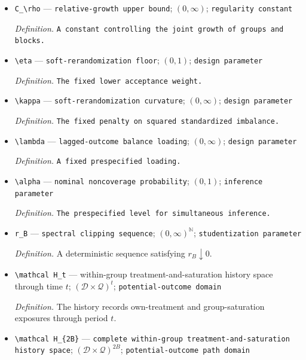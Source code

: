 \documentclass{article}
\begin{document}
\begin{itemize}
  \item \texttt{C\_\allowbreak{}\textbackslash{}\allowbreak{}rho} --- \texttt{relative-\allowbreak{}growth upper bound}; \((0,\infty)\); \texttt{regularity constant}
  \par\smallskip\noindent\emph{Definition.} \texttt{A constant controlling the joint growth of groups and blocks.}
  \item \texttt{\textbackslash{}\allowbreak{}eta} --- \texttt{soft-\allowbreak{}rerandomization floor}; \((0,1)\); \texttt{design parameter}
  \par\smallskip\noindent\emph{Definition.} \texttt{The fixed lower acceptance weight.}
  \item \texttt{\textbackslash{}\allowbreak{}kappa} --- \texttt{soft-\allowbreak{}rerandomization curvature}; \((0,\infty)\); \texttt{design parameter}
  \par\smallskip\noindent\emph{Definition.} \texttt{The fixed penalty on squared standardized imbalance.}
  \item \texttt{\textbackslash{}\allowbreak{}lambda} --- \texttt{lagged-\allowbreak{}outcome balance loading}; \((0,\infty)\); \texttt{design parameter}
  \par\smallskip\noindent\emph{Definition.} \texttt{A fixed prespecified loading.}
  \item \texttt{\textbackslash{}\allowbreak{}alpha} --- \texttt{nominal noncoverage probability}; \((0,1)\); \texttt{inference parameter}
  \par\smallskip\noindent\emph{Definition.} \texttt{The prespecified level for simultaneous inference.}
  \item \texttt{r\_\allowbreak{}B} --- \texttt{spectral clipping sequence}; \((0,\infty)^{\mathbb N}\); \texttt{studentization parameter}
  \par\smallskip\noindent\emph{Definition.} A deterministic sequence satisfying \(r_B\downarrow0\).
  \item \texttt{\textbackslash{}\allowbreak{}mathcal H\_\allowbreak{}t} --- within-group treatment-and-saturation history space through time \(t\); \((\mathcal D\times\mathcal Q)^t\); \texttt{potential-\allowbreak{}outcome domain}
  \par\smallskip\noindent\emph{Definition.} The history records own-treatment and group-saturation exposures through period \(t\).
  \item \texttt{\textbackslash{}\allowbreak{}mathcal H\_\allowbreak{}\{2B\}\allowbreak{}} --- \texttt{complete within-\allowbreak{}group treatment-\allowbreak{}and-\allowbreak{}saturation history space}; \((\mathcal D\times\mathcal Q)^{2B}\); \texttt{potential-\allowbreak{}outcome path domain}

\end{itemize}
\end{document}
